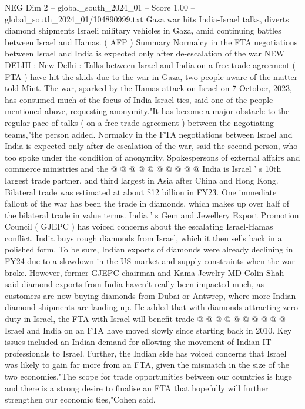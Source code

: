\begin{textsample}{NEG Dim 2 – global\_south\_2024\_01 – Score 1.00 – global\_south\_2024\_01/104890999.txt}  \label{ex:f2_neg_322}
Gaza war hits India-Israel talks, diverts diamond shipments Israeli military vehicles in Gaza, amid continuing battles between Israel and Hamas. ( AFP ) Summary Normalcy in the FTA negotiations between Israel and India is expected only after de-escalation of the war NEW DELHI : New Delhi : Talks between Israel and India on a free trade agreement ( FTA ) have hit the skids due to the war in Gaza, two people aware of the matter told Mint.
The war, sparked by the Hamas attack on Israel on 7 October, 2023, has consumed much of the focus of India-Israel ties, said one of the people mentioned above, requesting anonymity."It has become a major obstacle to the regular pace of talks ( on a free trade agreement ) between the negotiating teams,"the person added.
Normalcy in the FTA negotiations between Israel and India is expected only after de-escalation of the war, said the second person, who too spoke under the condition of anonymity.
Spokespersons of external affairs and commerce ministries and the @ @ @ @ @ @ @ @ @ @ India is Israel ' s 10th largest trade partner, and third largest in Asia after China and Hong Kong.
Bilateral trade was estimated at about \$12 billion in FY23.
One immediate fallout of the war has been the trade in diamonds, which makes up over half of the bilateral trade in value terms.
India ' s Gem and Jewellery Export Promotion Council ( GJEPC ) has voiced concerns about the escalating Israel-Hamas conflict.
India buys rough diamonds from Israel, which it then sells back in a polished form.
To be sure, Indian exports of diamonds were already declining in FY24 due to a slowdown in the US market and supply constraints when the war broke.
However, former GJEPC chairman and Kama Jewelry MD Colin Shah said diamond exports from India haven't really been impacted much, as customers are now buying diamonds from Dubai or Antwrep, where more Indian diamond shipments are landing up.
He added that with diamonds attracting zero duty in Israel, the FTA with Israel will benefit trade @ @ @ @ @ @ @ @ @ @ Israel and India on an FTA have moved slowly since starting back in 2010.
Key issues included an Indian demand for allowing the movement of Indian IT professionals to Israel.
Further, the Indian side has voiced concerns that Israel was likely to gain far more from an FTA, given the mismatch in the size of the two economies."The scope for trade opportunities between our countries is huge and there is a strong desire to finalise an FTA that hopefully will further strengthen our economic ties,"Cohen said.

\end{textsample}
